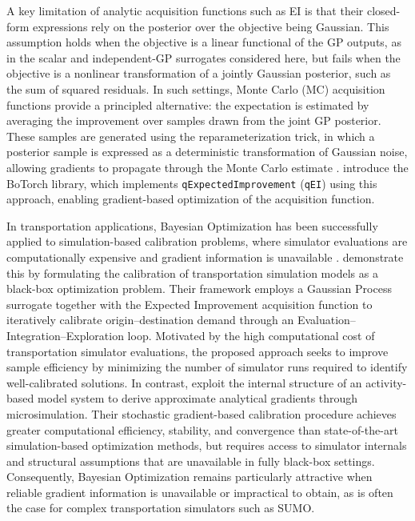 \documentclass[11pt]{article}
\begin{document}
A key limitation of analytic acquisition functions such as EI is that their closed-form
expressions rely on the posterior over the objective being Gaussian. This assumption holds
when the objective is a linear functional of the GP outputs, as in the scalar and
independent-GP surrogates considered here, but fails when the objective is a nonlinear
transformation of a jointly Gaussian posterior, such as the sum of squared residuals. In
such settings, Monte Carlo (MC) acquisition functions provide a principled alternative:
the expectation is estimated by averaging the improvement over samples drawn from the
joint GP posterior. These samples are generated using the reparameterization trick, in
which a posterior sample is expressed as a deterministic transformation of Gaussian noise,
allowing gradients to propagate through the Monte Carlo estimate
\parencite{Wilson2018,Balandat2020}. \textcite{Balandat2020} introduce the BoTorch
library, which implements \texttt{qExpectedImprovement} (\texttt{qEI}) using
this approach, enabling gradient-based optimization of the acquisition function.


In transportation applications, Bayesian Optimization has been successfully applied to simulation-based calibration problems, where simulator evaluations are computationally expensive and gradient information is unavailable \textcite{agriesti2023bayesian,schultz2018bayesian}. \textcite{schultz2018bayesian} demonstrate this by formulating the calibration of transportation simulation models as a black-box optimization problem. Their framework employs a Gaussian Process surrogate together with the Expected Improvement acquisition function to iteratively calibrate origin--destination demand through an Evaluation--Integration--Exploration loop. Motivated by the high computational cost of transportation simulator evaluations, the proposed approach seeks to improve sample efficiency by minimizing the number of simulator runs required to identify well-calibrated solutions. In contrast, \textcite{chen2020} exploit the internal structure of an activity-based model system to derive approximate analytical gradients through microsimulation. Their stochastic gradient-based calibration procedure achieves greater computational efficiency, stability, and convergence than state-of-the-art simulation-based optimization methods, but requires access to simulator internals and structural assumptions that are unavailable in fully black-box settings. Consequently, Bayesian Optimization remains particularly attractive when reliable gradient information is unavailable or impractical to obtain, as is often the case for complex transportation simulators such as SUMO.
\end{document}
